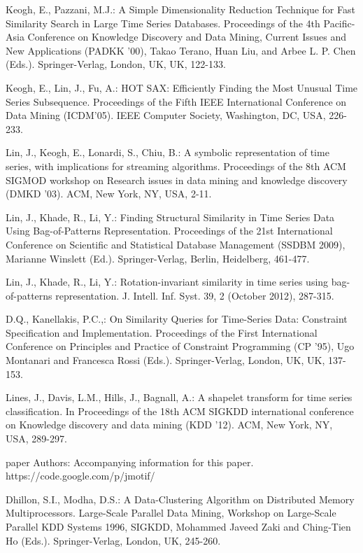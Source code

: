 \documentclass{llncs}
\begin{document}
\begin{thebibliography}{5}
Keogh, E., Pazzani, M.J.:
A Simple Dimensionality Reduction Technique for Fast Similarity Search in Large Time Series Databases. 
Proceedings of the 4th Pacific-Asia Conference on Knowledge Discovery and Data Mining, Current Issues and New Applications (PADKK '00), 
Takao Terano, Huan Liu, and Arbee L. P. Chen (Eds.). Springer-Verlag, London, UK, UK, 122-133.

Keogh, E., Lin, J., Fu, A.:
HOT SAX: Efficiently Finding the Most Unusual Time Series Subsequence. 
Proceedings of the Fifth IEEE International Conference on Data Mining (ICDM'05). 
IEEE Computer Society, Washington, DC, USA, 226-233.

Lin, J., Keogh, E., Lonardi, S., Chiu, B.:
A symbolic representation of time series, with implications for streaming algorithms. 
Proceedings of the 8th ACM SIGMOD workshop on Research issues in data mining and knowledge discovery (DMKD '03).
ACM, New York, NY, USA, 2-11.

Lin, J., Khade, R., Li, Y.:
Finding Structural Similarity in Time Series Data Using Bag-of-Patterns Representation. 
Proceedings of the 21st International Conference on Scientific and Statistical Database Management (SSDBM 2009),
Marianne Winslett (Ed.). Springer-Verlag, Berlin, Heidelberg, 461-477.

Lin, J., Khade, R., Li, Y.:
Rotation-invariant similarity in time series using bag-of-patterns representation. 
J. Intell. Inf. Syst. 39, 2 (October 2012), 287-315.

D.Q., Kanellakis, P.C.,:
On Similarity Queries for Time-Series Data: Constraint Specification and Implementation. 
Proceedings of the First International Conference on Principles and Practice of Constraint Programming (CP '95), 
Ugo Montanari and Francesca Rossi (Eds.). Springer-Verlag, London, UK, UK, 137-153.

Lines, J., Davis, L.M., Hills, J., Bagnall, A.:
A shapelet transform for time series classification. 
In Proceedings of the 18th ACM SIGKDD international conference on Knowledge discovery and data mining (KDD '12). 
ACM, New York, NY, USA, 289-297.

paper Authors: 
Accompanying information for this paper. 
https://code.google.com/p/jmotif/

Dhillon, S.I., Modha, D.S.: 
A Data-Clustering Algorithm on Distributed Memory Multiprocessors. 
Large-Scale Parallel Data Mining, Workshop on Large-Scale Parallel KDD Systems 1996, SIGKDD,
Mohammed Javeed Zaki and Ching-Tien Ho (Eds.). Springer-Verlag, London, UK, 245-260.

\end{thebibliography}

%
\end{document}
